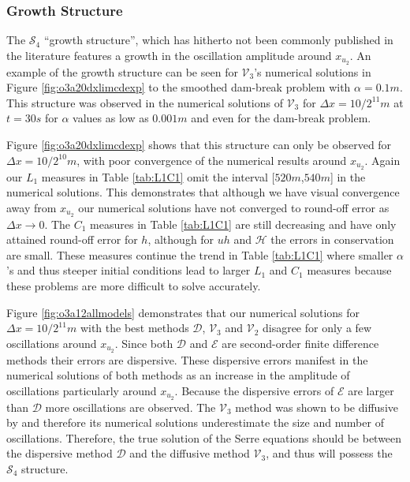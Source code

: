 \documentclass[times]{elsarticle}
\begin{document}
\subsubsection{Growth Structure}
The $\mathcal{S}_4$ ``growth structure'', which has hitherto not been commonly published in the literature features a growth in the oscillation amplitude around $x_{u_2}$. An example of the growth structure can be seen for $\mathcal{V}_3$'s numerical solutions in Figure \ref{fig:o3a20dxlimcdexp} to the smoothed dam-break problem with $\alpha = 0.1m$. This structure was observed in the numerical solutions of $\mathcal{V}_3$ for $\Delta x = 10/2^{11}m$ at $t=30s$ for $\alpha$ values as low as $0.001m$ and even for the dam-break problem.

Figure \ref{fig:o3a20dxlimcdexp} shows that this structure can only be observed for $\Delta x = 10 / 2^{10}m$, with poor convergence of the numerical results around $x_{u_2}$. Again our $L_1$ measures in Table \ref{tab:L1C1} omit the interval [$520m$,$540m$] in the numerical solutions. This demonstrates that although we have visual convergence away from $x_{u_2}$ our numerical solutions have not converged to round-off error as $\Delta x \rightarrow 0$. The $C_1$ measures in Table \ref{tab:L1C1} are still decreasing and have only attained round-off error for $h$, although for $uh$ and $\mathcal{H}$ the errors in conservation are small. These measures continue the trend in Table \ref{tab:L1C1} where smaller $\alpha$'s and thus steeper initial conditions lead to larger $L_1$ and $C_1$ measures because these problems are more difficult to solve accurately.

Figure \ref{fig:o3a12allmodels} demonstrates that our numerical solutions for $\Delta x = 10 /2^{11}m$ with the best methods $\mathcal{D}$, $\mathcal{V}_3$ and $\mathcal{V}_2$ disagree for only a few oscillations around $x_{u_2}$. Since both $\mathcal{D}$ and $\mathcal{E}$ are second-order finite difference methods their errors are dispersive. These dispersive errors manifest in the numerical solutions of both methods as an increase in the amplitude of oscillations particularly around $x_{u_2}$. Because the dispersive errors of $\mathcal{E}$ are larger than $\mathcal{D}$ more oscillations are observed. The $\mathcal{V}_3$ method was shown to be diffusive by \citet{Zoppou-etal-2017} and therefore its numerical solutions underestimate the size and number of oscillations. Therefore, the true solution of the Serre equations should be between the dispersive method $\mathcal{D}$ and the diffusive method $\mathcal{V}_3$, and thus will possess the $\mathcal{S}_4$ structure.
\end{document}
